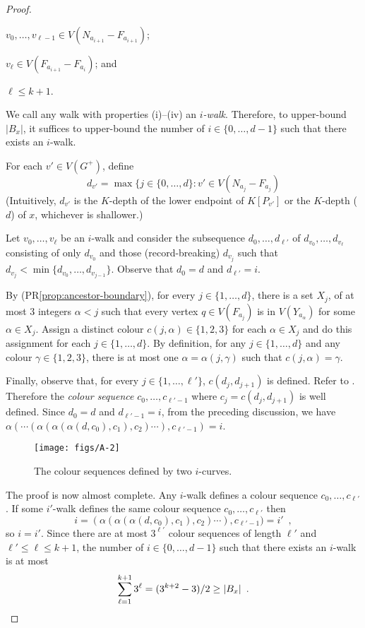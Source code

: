\documentclass{patmorin}
\renewcommand{\propref}[1]{(PR\ref{prop:#1})}
\begin{document}
\begin{proof}
\begin{compactenum}[(i)]
    \item $v_0,\ldots,v_{\ell-1}\in V(N_{a_{i+1}}-F_{a_{i+1}})$;
    
    \item $v_\ell\in V(F_{a_{i+1}}-F_{a_i})$; and
    
    \item $\ell\le k+1$.
  \end{compactenum}
  We call any walk with properties (i)--(iv) an \emph{$i$-walk}. Therefore, to upper-bound $|B_x|$, it suffices to upper-bound the number of $i\in\{0,\ldots,d-1\}$ such that there exists an $i$-walk.
  
  For each $v'\in V(G^+)$, define
  \[  
      d_{v'}=\max\{j\in\{0,\ldots,d\} : v'\in V(N_{a_j}-F_{a_j})
  \]
  (Intuitively, $d_{v'}$ is the $K$-depth of the lower endpoint of $K[P_{v'}]$ or the $K$-depth ($d$) of $x$, whichever is shallower.)
     
  Let $v_0,\ldots,v_\ell$ be an $i$-walk and consider the subsequence $d_0,\ldots,d_{\ell'}$ of $d_{v_0},\ldots,d_{v_\ell}$ consisting of only $d_{v_0}$ and those (record-breaking) $d_{v_j}$ such that $d_{v_j}<\min\{d_{v_0},\ldots,d_{v_{j-1}}\}$.  Observe that $d_0=d$ and $d_{\ell'}=i$.
  
  By \propref{ancestor-boundary}, for every $j\in\{1,\ldots,d\}$, there is a set $X_{j}$, of at most 3 integers $\alpha < j$ such that every vertex $q\in V(F_{a_j})$ is in $V(Y_{a_{\alpha}})$ for some $\alpha\in X_j$.
  Assign a distinct colour $c(j,\alpha)\in\{1,2,3\}$ for each $\alpha\in X_j$ and do this assignment for each $j\in\{1,\ldots,d\}$.  By definition, for any $j\in\{1,\ldots,d\}$ and any colour $\gamma\in\{1,2,3\}$, there is at most one $\alpha=\alpha(j,\gamma)$ such that $c(j,\alpha)=\gamma$.
  
  Finally, observe that, for every $j\in\{1,\ldots,\ell'\}$,  $c(d_j,d_{j+1})$ is defined.  Refer to . Therefore the \emph{colour sequence} $c_0,\ldots,c_{\ell'-1}$ where $c_j=c(d_j,d_{j+1})$ is well defined.  Since $d_0=d$ and $d_{\ell'-1}=i$, from the preceding discussion, we have $\alpha(\cdots (\alpha(\alpha(\alpha(d,c_0),c_1),c_2)\cdots),c_{\ell'-1}) = i$.

  \begin{figure}
    \begin{center}
        \texttt{[image: figs/A-2]}
    \end{center}
    \caption{The colour sequences defined by two $i$-curves.}
  \end{figure}

  The proof is now almost complete.  Any $i$-walk defines a colour sequence $c_0,\ldots,c_{\ell'}$.  If some $i'$-walk defines the same colour sequence $c_0,\ldots,c_{\ell'}$ then
  \[
        i = (\alpha(\alpha(\alpha(d,c_0),c_1),c_2)\cdots),c_{\ell'-1}) = i' \enspace ,
  \]
  so $i=i'$.  Since there are at most $3^{\ell'}$ colour sequences of length $\ell'$ and $\ell'\le \ell \le k+1$, the number of $i\in\{0,\ldots,d-1\}$ such that there exists an $i$-walk is at most
  \[
     \sum_{\ell=1}^{k+1} 3^\ell = (3^{k+2}-3)/2 \ge |B_x| \eqlabel{bag-size} \enspace . \qedhere
  \]
\end{proof}
\end{document}
